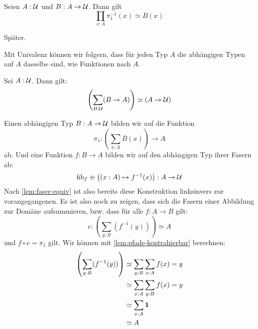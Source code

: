 \begin{lemma}
  \label{lem:faser-equiv}
  Seien $A:\mathcal{U}$ und $B:A\to\mathcal{U}$. Dann gilt
  \[
     \prod_{x:A} \pi_1^{-1}(x)\simeq B(x)
  \]
\end{lemma}
\begin{beweis}
  Später.
\end{beweis}

Mit Univalenz können wir folgern, dass für jeden Typ $A$ die abhängigen Typen auf $A$ dasselbe sind, wie Funktionen nach $A$.
\begin{theorem}[Objektklassifikation]
  \label{lem:objektklassifizierer}
  Sei $A:\mathcal{U}$. Dann gilt:
  \[
    \left(\sum_{B:\mathcal{U}}(B\to A)\right)\simeq (A\to \mathcal{U})
  \]
\end{theorem}

\begin{beweis}
  Einen abhängigen Typ $B:A\to\mathcal{U}$ bilden wir auf die Funktion
  \[
    \pi_1:\left(\sum_{x:A}B(x)\right)\to A
  \]
  ab. Und eine Funktion $f:B\to A$ bilden wir auf den abhängigen Typ ihrer Fasern ab:
  \[
    \mathrm{fib}_f\equiv \left((x:A)\mapsto f^{-1}(x)\right):A\to \mathcal{U}
  \]
  Nach \cref{lem:faser-equiv} ist also bereits diese Konstruktion linksinvers zur vorangegangenen.
  Es ist also noch zu zeigen, dass sich die Fasern einer Abbildung zur Domäne aufsummieren, bzw. dass für alle
  $f:A\to B$ gilt:
  \[
    e:\left(\sum_{y:B}(f^{-1}(y))\right) \simeq A
  \]
  und $f\circ e=\pi_1$ gilt. Wir können mit \cref{lem:pfade-kontrahierbar} berechnen:
  \begin{align*}
    \left(\sum_{y:B}(f^{-1}(y))\right) &\simeq \sum_{y:B}\sum_{x:A}f(x)=y \\
                                       &\simeq \sum_{x:A}\sum_{y:B}f(x)=y\\
                                       &\simeq \sum_{x:A}\mathbf{1}\\
                                       &\simeq A
  \end{align*}
\end{beweis}


